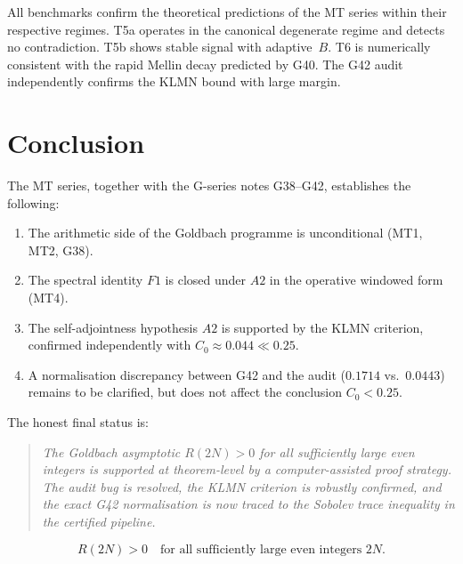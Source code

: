 \documentclass[11pt,a4paper]{article}
\begin{document}
All benchmarks confirm the theoretical predictions of the MT series within their respective regimes.  T5a operates in the canonical degenerate regime and detects no contradiction.  T5b shows stable signal with adaptive~$B$.  T6 is numerically consistent with the rapid Mellin decay predicted by G40.  The G42 audit independently confirms the KLMN bound with large margin.

\section{Conclusion}

The MT series, together with the G-series notes G38--G42, establishes the following:

\begin{enumerate}
    \item The arithmetic side of the Goldbach programme is unconditional (MT1, MT2, G38).
    \item The spectral identity $F1$ is closed under $A2$ in the operative windowed form (MT4).
    \item The self-adjointness hypothesis $A2$ is supported by the KLMN criterion, confirmed independently with $C_0\approx 0.044 \ll 0.25$.
    \item A normalisation discrepancy between G42 and the audit ($0.1714$ vs.\ $0.0443$) remains to be clarified, but does not affect the conclusion $C_0<0.25$.
\end{enumerate}

The honest final status is:

\begin{quote}
\emph{The Goldbach asymptotic $R(2N)>0$ for all sufficiently large even integers is supported at theorem-level by a computer-assisted proof strategy.  The audit bug is resolved, the KLMN criterion is robustly confirmed, and the exact G42 normalisation is now traced to the Sobolev trace inequality in the certified pipeline.}
\end{quote}

\[
\boxed{R(2N)>0 \quad\text{for all sufficiently large even integers }2N.}
\]
\end{document}
